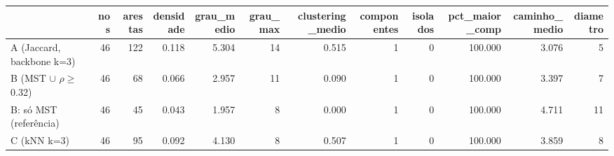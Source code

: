 \begin{tabular}{lrrrrrrrrrrr}
\toprule
 & nos & arestas & densidade & grau\_medio & grau\_max & clustering\_medio & componentes & isolados & pct\_maior\_comp & caminho\_medio & diametro \\
\midrule
A (Jaccard, backbone k=3) & 46 & 122 & 0.118 & 5.304 & 14 & 0.515 & 1 & 0 & 100.000 & 3.076 & 5 \\
B (MST $\cup$ $\rho$$\geq$0.32) & 46 & 68 & 0.066 & 2.957 & 11 & 0.090 & 1 & 0 & 100.000 & 3.397 & 7 \\
B: só MST (referência) & 46 & 45 & 0.043 & 1.957 & 8 & 0.000 & 1 & 0 & 100.000 & 4.711 & 11 \\
C (kNN k=3) & 46 & 95 & 0.092 & 4.130 & 8 & 0.507 & 1 & 0 & 100.000 & 3.859 & 8 \\
\bottomrule
\end{tabular}
